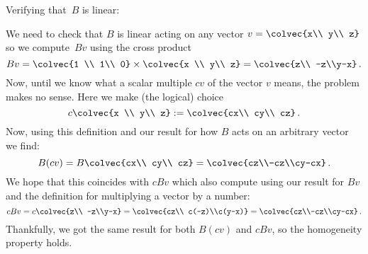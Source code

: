 \begin{example} Verifying that~$B$ is linear:

We need to check that $B$ is linear acting on any vector $v=\colvec{x\\ y\\ z}$ so we compute~$Bv$
using the cross product
\[
Bv=\colvec{1 \\ 1\\ 0} \times \colvec{x \\ y\\ z}=\colvec{z\\ -z\\y-x}\, .
\]
Now, until we know what a scalar multiple $cv$ of the vector $v$ means, the problem makes no sense. 
Here we make (the logical) choice
\[
c\colvec{x \\ y\\ z} := \colvec{cx\\ cy\\ cz}\, .
\]
Now, using this definition and our result for how $B$ acts on an arbitrary vector we find:
\[
B(cv)=B\colvec{cx\\ cy\\ cz}=\colvec{cz\\-cz\\cy-cx}\, .
\]
We hope that this coincides with $cBv$ which also compute using our result for $Bv$ and the definition
for multiplying a vector by a number:
\[
cBv=c\colvec{z\\ -z\\y-x}=\colvec{cz\\ c(-z)\\c(y-x)}=\colvec{cz\\-cz\\cy-cx}\, .
\]
Thankfully, we got the same result for both $B(cv)$ and $cBv$, so the homogeneity property holds.


\end{example}

